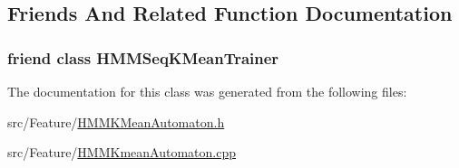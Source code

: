 \subsection{Friends And Related Function Documentation}
\hypertarget{class_h_m_m_k_mean_automaton_af469c501c992964354ce9cdaaf140d43}{
\subsubsection[{H\+M\+M\+Seq\+K\+Mean\+Trainer}]{\setlength{\rightskip}{0pt plus 5cm}friend class {\bf H\+M\+M\+Seq\+K\+Mean\+Trainer}\hspace{0.3cm}{\ttfamily [friend]}}}\label{class_h_m_m_k_mean_automaton_af469c501c992964354ce9cdaaf140d43}


The documentation for this class was generated from the following files\+:\begin{DoxyCompactItemize}
\item 
src/\+Feature/\hyperlink{_h_m_m_k_mean_automaton_8h}{H\+M\+M\+K\+Mean\+Automaton.\+h}\item 
src/\+Feature/\hyperlink{_h_m_m_kmean_automaton_8cpp}{H\+M\+M\+Kmean\+Automaton.\+cpp}\end{DoxyCompactItemize}

